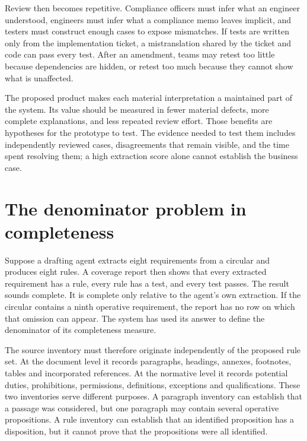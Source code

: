 Review then becomes repetitive. Compliance officers must infer what an engineer
understood, engineers must infer what a compliance memo leaves implicit, and
testers must construct enough cases to expose mismatches. If tests are written
only from the implementation ticket, a mistranslation shared by the ticket and
code can pass every test. After an amendment, teams may retest too little because
dependencies are hidden, or retest too much because they cannot show what is
unaffected.

The proposed product makes each material interpretation a maintained part of the
system. Its value should be measured in fewer material defects, more complete
explanations, and less repeated review effort. Those benefits are hypotheses for
the prototype to test. The evidence needed to test them includes independently
reviewed cases, disagreements that remain visible, and the time spent resolving
them; a high extraction score alone cannot establish the business case.

\section{The denominator problem in completeness}
\label{merge:M01:03}

\label{sec:problem-denominator}
Suppose a drafting agent extracts eight requirements from a circular and produces
eight rules. A coverage report then shows that every extracted requirement has a
rule, every rule has a test, and every test passes. The result sounds complete.
It is complete only relative to the agent's own extraction. If the circular
contains a ninth operative requirement, the report has no row on which that
omission can appear. The system has used its answer to define the denominator
of its completeness measure.

The source inventory must therefore originate independently of the proposed
rule set. At the document level it records paragraphs, headings, annexes,
footnotes, tables and incorporated references. At the normative level it records
potential duties, prohibitions, permissions, definitions, exceptions and
qualifications. These two inventories serve different purposes. A paragraph
inventory can establish that a passage was considered, but one paragraph may
contain several operative propositions. A rule inventory can establish that an
identified proposition has a disposition, but it cannot prove that the
propositions were all identified.

